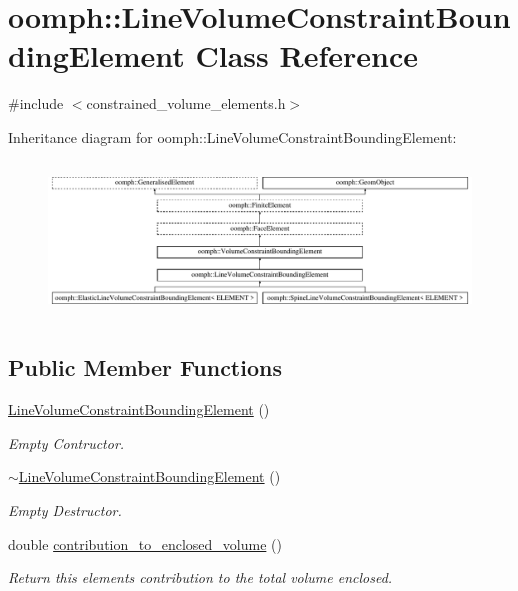 \hypertarget{classoomph_1_1LineVolumeConstraintBoundingElement}{}\section{oomph\+:\+:Line\+Volume\+Constraint\+Bounding\+Element Class Reference}
\label{classoomph_1_1LineVolumeConstraintBoundingElement}


{\ttfamily \#include $<$constrained\+\_\+volume\+\_\+elements.\+h$>$}

Inheritance diagram for oomph\+:\+:Line\+Volume\+Constraint\+Bounding\+Element\+:\begin{figure}[H]
\begin{center}
\leavevmode
\includegraphics[height=4.179104cm]{classoomph_1_1LineVolumeConstraintBoundingElement}
\end{center}
\end{figure}
\subsection*{Public Member Functions}
\begin{DoxyCompactItemize}
\item 
\hyperlink{classoomph_1_1LineVolumeConstraintBoundingElement_a39baabe26bcf3958b80fe3dd5430c347}{Line\+Volume\+Constraint\+Bounding\+Element} ()
\begin{DoxyCompactList}\small\item\em Empty Contructor. \end{DoxyCompactList}\item 
\hyperlink{classoomph_1_1LineVolumeConstraintBoundingElement_a905d0b20f7f9a009d07c7d4506b404ed}{$\sim$\+Line\+Volume\+Constraint\+Bounding\+Element} ()
\begin{DoxyCompactList}\small\item\em Empty Destructor. \end{DoxyCompactList}\item 
double \hyperlink{classoomph_1_1LineVolumeConstraintBoundingElement_a099357dfeca3c4e1d84b0979cd495da9}{contribution\+\_\+to\+\_\+enclosed\+\_\+volume} ()
\begin{DoxyCompactList}\small\item\em Return this element\textquotesingle{}s contribution to the total volume enclosed. \end{DoxyCompactList}\end{DoxyCompactItemize}
